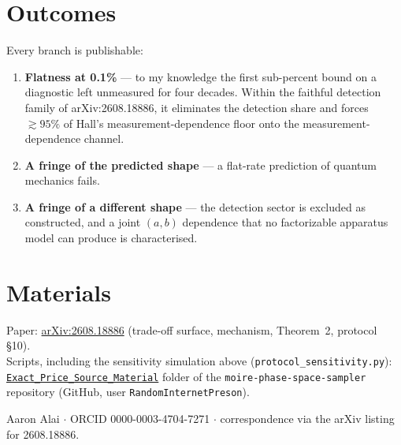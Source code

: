\documentclass[11pt]{article}
\begin{document}
\section*{Outcomes}
Every branch is publishable:
\begin{enumerate}[nosep]
\item \textbf{Flatness at 0.1\%} --- to my knowledge the first sub-percent bound on a diagnostic left unmeasured for four decades. Within the faithful detection family of arXiv:2608.18886, it eliminates the detection share and forces $\gtrsim 95\%$ of Hall's measurement-dependence floor onto the measurement-dependence channel.
\item \textbf{A fringe of the predicted shape} --- a flat-rate prediction of quantum mechanics fails.
\item \textbf{A fringe of a different shape} --- the detection sector is excluded as constructed, and a joint $(a,b)$ dependence that no factorizable apparatus model can produce is characterised.
\end{enumerate}

\section*{Materials}
Paper: \href{https://arxiv.org/abs/2608.18886}{arXiv:2608.18886} (trade-off surface, mechanism, Theorem~2, protocol \S10).\\
Scripts, including the sensitivity simulation above (\texttt{protocol\_sensitivity.py}): \href{https://github.com/RandomInternetPreson/moire-phase-space-sampler/tree/main/DST_Bell_MI/Exact_Price_Source_Material}{\texttt{Exact\_Price\_Source\_Material}} folder of the \texttt{moire-phase-space-sampler} repository (GitHub, user \texttt{RandomInternetPreson}).

\medskip
\noindent Aaron Alai $\cdot$ ORCID 0000-0003-4704-7271 $\cdot$ correspondence via the arXiv listing for 2608.18886.
\end{document}

